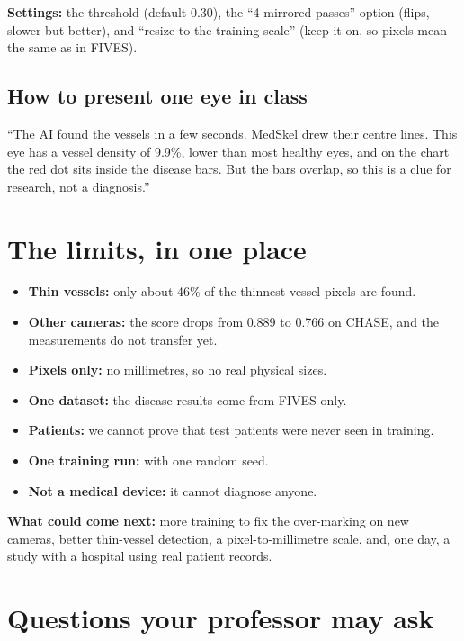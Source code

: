 \documentclass[11pt,a4paper]{article}
\begin{document}
\textbf{Settings:} the threshold (default 0.30), the ``4 mirrored passes'' option (flips, slower but better), and ``resize to the training scale'' (keep it on, so pixels mean the same as in FIVES).

\subsection{How to present one eye in class}
``The AI found the vessels in a few seconds. MedSkel drew their centre lines. This eye has a vessel density of 9.9\%, lower than most healthy eyes, and on the chart the red dot sits inside the disease bars. But the bars overlap, so this is a clue for research, not a diagnosis.''



\section{The limits, in one place}
\begin{itemize}
  \item \textbf{Thin vessels:} only about 46\% of the thinnest vessel pixels are found.
  \item \textbf{Other cameras:} the score drops from 0.889 to 0.766 on CHASE, and the measurements do not transfer yet.
  \item \textbf{Pixels only:} no millimetres, so no real physical sizes.
  \item \textbf{One dataset:} the disease results come from FIVES only.
  \item \textbf{Patients:} we cannot prove that test patients were never seen in training.
  \item \textbf{One training run:} with one random seed.
  \item \textbf{Not a medical device:} it cannot diagnose anyone.
\end{itemize}

\textbf{What could come next:} more training to fix the over-marking on new cameras, better thin-vessel detection, a pixel-to-millimetre scale, and, one day, a study with a hospital using real patient records.

\section{Questions your professor may ask}
\end{document}
